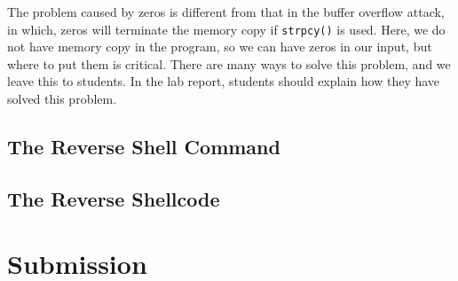 The problem caused by zeros is different from that
in the buffer overflow attack, in which,
zeros will terminate the memory copy if \texttt{strpcy()} is used. 
Here, we do not have memory copy in the program, 
so we can have zeros in our input, but where to put them
is critical. 
There are many ways to solve this problem, and 
we leave this to students. In the lab report, students
should explain how they have solved this problem. 



\subsection{The Reverse Shell Command} 
\label{fmt:rev_shellcmd}




\subsection{The Reverse Shellcode} 
\label{fmt:rev_shellcode}


 

\section{Submission}







